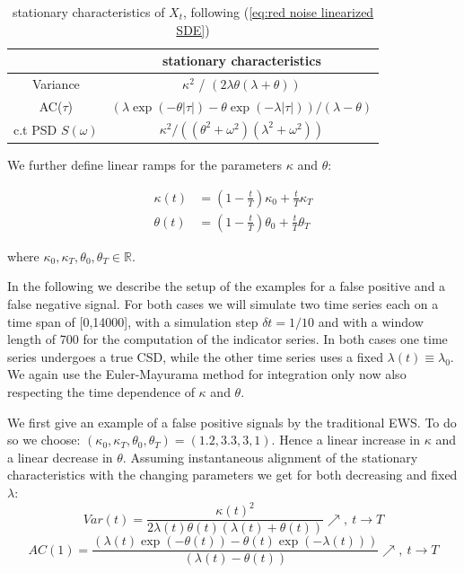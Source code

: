 \documentclass[%
thesis=student,%
coverpage=false,%
titlepage=false,%
headmarks=true, %
english,%
font=libertine, %
math=newpxtx, %
BCOR=5mm,%
coverBCOR=11mm%
]{tumbook}
\begin{document}
\begin{table}[h!]
\centering
\begin{tabular}{|c|c|}
\hline
& stationary characteristics\\
\hline
Variance & $\kappa^2$ / $(2\lambda\theta(\lambda + \theta))$\\
AC($\tau$) & $(\lambda\exp(-\theta\lvert\tau\rvert)-\theta\exp(-\lambda\lvert\tau\rvert))/(\lambda - \theta)$\\
c.t PSD $S(\omega)$ & $\kappa^2/((\theta^2 + \omega^2)(\lambda^2 + \omega^2))$\\
\hline
\end{tabular}
\caption{stationary characteristics of $X_{t}$, following (\ref{eq:red noise linearized SDE})}
\label{tab:simple_table}
\end{table}

We further define linear ramps for the parameters $\kappa$ and $\theta$:

\begin{subequations}
    \begin{align*}
        \kappa(t) &= (1-\frac{t}{T})\kappa_{0} + \frac{t}{T}\kappa_{T} \\
        \theta(t) &= (1-\frac{t}{T})\theta_{0} + \frac{t}{T}\theta_{T}
    \end{align*}
\end{subequations}

where $\kappa_{0},\kappa_{T},\theta_{0},\theta_{T} \in \mathbb{R}$. 

In the following we describe the setup of the examples for a false positive and a false negative signal. For both cases we will simulate two time series each on a time span of [0,14000], with a simulation step $\delta t = 1/10$ and with a window length of 700 for the computation of the indicator series. In both cases one time series undergoes a true CSD, while the other time series uses a fixed $\lambda(t) \equiv \lambda_{0}$. We again use the Euler-Mayurama method for integration only now also respecting the time dependence of $\kappa$ and $\theta$.

We first give an example of a false positive signals by the traditional EWS. To do so we choose: $(\kappa_{0},\kappa_{T},\theta_{0},\theta_{T}) = (1.2,3.3,3,1)$. Hence a linear increase in $\kappa$ and a linear decrease in $\theta$. Assuming instantaneous alignment of the stationary characteristics with the changing parameters we get for both decreasing and fixed $\lambda$: 
\[
Var(t) = \frac{\kappa(t)^2}{2\lambda(t)\theta(t)(\lambda(t) + \theta(t))} \nearrow, \ t \rightarrow T
\]
\[
AC(1) = \frac{(\lambda(t)\exp(-\theta(t))-\theta(t)\exp(-\lambda(t)))}{(\lambda(t)-\theta(t))} \nearrow, \ t \rightarrow T
\]
\end{document}
